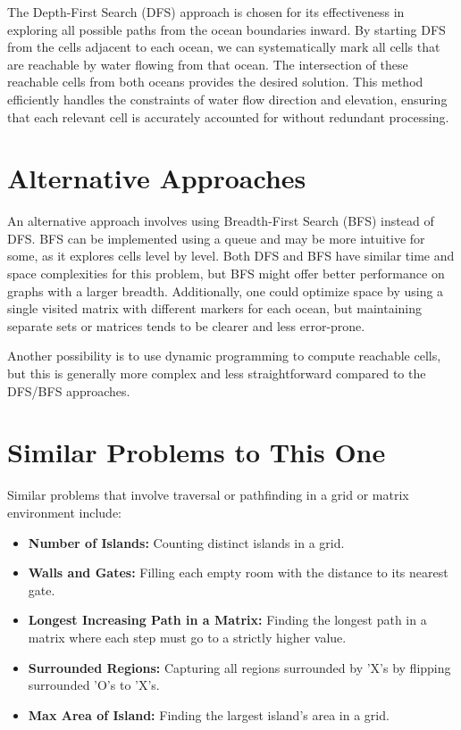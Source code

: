 The Depth-First Search (DFS) approach is chosen for its effectiveness in exploring all possible paths from the ocean boundaries inward. By starting DFS from the cells adjacent to each ocean, we can systematically mark all cells that are reachable by water flowing from that ocean. The intersection of these reachable cells from both oceans provides the desired solution. This method efficiently handles the constraints of water flow direction and elevation, ensuring that each relevant cell is accurately accounted for without redundant processing.

\section*{Alternative Approaches}

An alternative approach involves using Breadth-First Search (BFS) instead of DFS. BFS can be implemented using a queue and may be more intuitive for some, as it explores cells level by level. Both DFS and BFS have similar time and space complexities for this problem, but BFS might offer better performance on graphs with a larger breadth. Additionally, one could optimize space by using a single visited matrix with different markers for each ocean, but maintaining separate sets or matrices tends to be clearer and less error-prone.

Another possibility is to use dynamic programming to compute reachable cells, but this is generally more complex and less straightforward compared to the DFS/BFS approaches.

\section*{Similar Problems to This One}

Similar problems that involve traversal or pathfinding in a grid or matrix environment include:
    
\begin{itemize}
    \item \textbf{Number of Islands:} Counting distinct islands in a grid.
    
    \item \textbf{Walls and Gates:} Filling each empty room with the distance to its nearest gate.
    
    \item \textbf{Longest Increasing Path in a Matrix:} Finding the longest path in a matrix where each step must go to a strictly higher value.
    
    \item \textbf{Surrounded Regions:} Capturing all regions surrounded by 'X's by flipping surrounded 'O's to 'X's.
    
    \item \textbf{Max Area of Island:} Finding the largest island's area in a grid.
\end{itemize}

